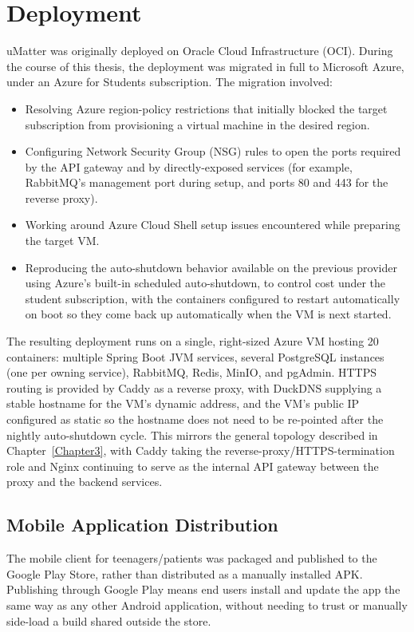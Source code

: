 \section{Deployment}

uMatter was originally deployed on Oracle Cloud Infrastructure (OCI). During the course of this thesis, the deployment was migrated in full to Microsoft Azure, under an Azure for Students subscription. The migration involved:

\begin{itemize}
\item Resolving Azure region-policy restrictions that initially blocked the target subscription from provisioning a virtual machine in the desired region.
\item Configuring Network Security Group (NSG) rules to open the ports required by the API gateway and by directly-exposed services (for example, RabbitMQ's management port during setup, and ports 80 and 443 for the reverse proxy).
\item Working around Azure Cloud Shell setup issues encountered while preparing the target VM.
\item Reproducing the auto-shutdown behavior available on the previous provider using Azure's built-in scheduled auto-shutdown, to control cost under the student subscription, with the containers configured to restart automatically on boot so they come back up automatically when the VM is next started.
\end{itemize}

The resulting deployment runs on a single, right-sized Azure VM hosting 20 containers: multiple Spring Boot JVM services, several PostgreSQL instances (one per owning service), RabbitMQ, Redis, MinIO, and pgAdmin. HTTPS routing is provided by Caddy as a reverse proxy, with DuckDNS supplying a stable hostname for the VM's dynamic address, and the VM's public IP configured as static so the hostname does not need to be re-pointed after the nightly auto-shutdown cycle. This mirrors the general topology described in Chapter~\ref{Chapter3}, with Caddy taking the reverse-proxy/HTTPS-termination role and Nginx continuing to serve as the internal API gateway between the proxy and the backend services.

\subsection{Mobile Application Distribution}

The mobile client for teenagers/patients was packaged and published to the Google Play Store, rather than distributed as a manually installed APK. Publishing through Google Play means end users install and update the app the same way as any other Android application, without needing to trust or manually side-load a build shared outside the store.

